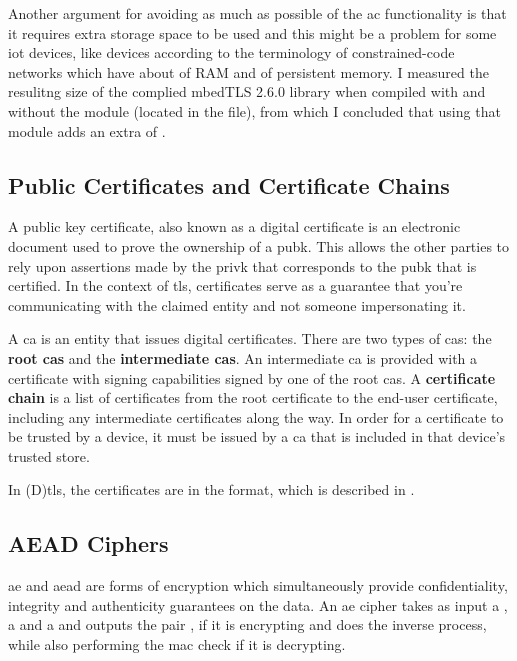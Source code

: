 \documentclass{llncs}
\begin{document}
Another argument for avoiding as much as possible of the \gls{ac} functionality
is that it requires extra storage space to be used and this might be a problem for some \gls{iot} devices,
like  devices according to the terminology of constrained-code
networks \cite{RFC7228} which have about  of RAM and 
of persistent memory. I measured the resulitng size of the complied mbedTLS 2.6.0 library
\cite{SSLLibra13:online} when compiled with and without the  module
(located in the  file), from which I concluded that using that module adds an
extra of .

\subsection{Public Certificates and Certificate Chains}

A public key certificate, also known as a digital certificate is an electronic
document used to prove the ownership of a \gls{pubk}. This allows the other parties
to rely upon assertions made by the \gls{privk} that corresponds to the \gls{pubk}
that is certified. In the context of \gls{tls}, certificates serve as a guarantee
that you're communicating with the claimed entity and not someone impersonating it.

A \gls{ca} is an entity that issues digital certificates. There are two types of
\gls{ca}s: the \textbf{root \gls{ca}s} and the \textbf{intermediate \gls{ca}s}.
An intermediate \gls{ca} is provided with a certificate with signing capabilities
signed by one of the root \gls{ca}s. A \textbf{certificate chain} is a list of
certificates from the root certificate to the end-user certificate, including
any intermediate certificates along the way. In order for a certificate
to be trusted by a device, it must be issued by a \gls{ca} that is included in that
device's trusted store.

In (D)\gls{tls}, the certificates are in the  format, which is
described in \cite{rfc5280}.

\subsection{AEAD Ciphers}

\gls{ae} and \gls{aead} are forms of encryption which simultaneously provide
confidentiality, integrity and authenticity guarantees on the data. An \gls{ae}
cipher takes as input a , a  and a 
and outputs the pair , if it is encrypting and does the inverse
process, while also performing the \gls{mac} check if it is decrypting.
\end{document}
